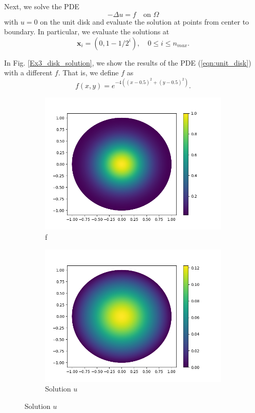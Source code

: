 \documentclass[12pt]{article}%
\theoremstyle{plain}
\numberwithin{equation}{section}
\begin{document}
 Next, we solve the PDE 
\begin{equation}
-\Delta u =f \quad\text{on }\Omega
\label{eqn:unit_disk}
\end{equation}
with $u=0$ on the unit disk and evaluate the solution at points from center to boundary.  In particular, we evaluate the solutions at
 \begin{equation}
 \textbf{x}_i=(0,1-1/2^i),\quad 0\leq i\leq n_{max}.
 \label{eqn:unit_disk_seq}
 \end{equation}

 In Fig. \ref{Ex3_disk_solution}, we show the results of the PDE (\ref{eqn:unit_disk}) with a different $f$. That is, we define $f$ as 
 $$
 f(x,y)=e^{-4((x-0.5)^2+(y-0.5)^2)}.
 $$
  \begin{figure}[H]%
    \centering
         \begin{subfigure}[h]{0.45\linewidth}
         \caption{f}
\includegraphics[width=\linewidth]{figures/Ex3/Ex3_disk_f.png}
\end{subfigure}
 \begin{subfigure}[h]{0.45\linewidth}
         \caption{Solution $u$}
\includegraphics[width=\linewidth]{figures/Ex3/Ex3_disk_solution.png}

\end{subfigure}
\end{figure}
\end{document}
